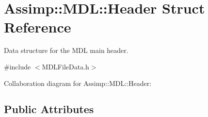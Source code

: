 \hypertarget{struct_assimp_1_1_m_d_l_1_1_header}{\section{Assimp\+:\+:M\+D\+L\+:\+:Header Struct Reference}
\label{struct_assimp_1_1_m_d_l_1_1_header}
}


Data structure for the M\+D\+L main header.  




{\ttfamily \#include $<$M\+D\+L\+File\+Data.\+h$>$}



Collaboration diagram for Assimp\+:\+:M\+D\+L\+:\+:Header\+:
\subsection*{Public Attributes}

